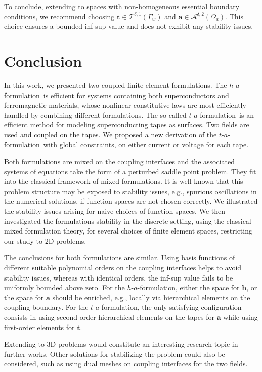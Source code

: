 \documentclass[journal]{IEEEtran}
\renewcommand{\vec}[1]{\boldsymbol{#1}} %
\renewcommand{\a}{\vec a}
\renewcommand{\t}{\vec t}
\newcommand{\h}{\vec h}
\newcommand{\Oa}{\Omega_a}
\newcommand{\haf}{$h$-$a$-formulation\ }
\newcommand{\taf}{$t$-$a$-formulation\ }
\newcommand{\hafOnly}{$h$-$a$-formulation}
\newcommand{\tafOnly}{$t$-$a$-formulation}
\newcommand{\aspdone}{\mathcal{A}^{\delta,1}}
\newcommand{\tspdone}{\mathcal{T}^{\delta,1}}
\newcommand{\aspdtwo}{\mathcal{A}^{\delta,2}}
\newcommand{\tspdtwo}{\mathcal{T}^{\delta,2}}
\begin{document}
To conclude, extending to spaces with non-homogeneous essential boundary conditions, we recommend choosing $\t \in \tspdone(\Gamma_w)$ and $\a \in \aspdtwo(\Oa)$. This choice ensures a bounded inf-sup value and does not exhibit any stability issues.


\section{Conclusion}\label{sec_conclusion}

In this work, we presented two coupled finite element formulations. The \haf is efficient for systems containing both superconductors and ferromagnetic materials, whose nonlinear constitutive laws are most efficiently handled by combining different formulations. The so-called \taf is an efficient method for modeling superconducting tapes as surfaces. Two fields are used and coupled on the tapes. We proposed a new derivation of the \taf with global constraints, on either current or voltage for each tape.

Both formulations are mixed on the coupling interfaces and the associated systems of equations take the form of a perturbed saddle point problem. They fit into the classical framework of mixed formulations. It is well known that this problem structure may be exposed to stability issues, e.g., spurious oscillations in the numerical solutions, if function spaces are not chosen correctly. We illustrated the stability issues arising for naive choices of function spaces. We then investigated the formulations stability in the discrete setting, using the classical mixed formulation theory, for several choices of finite element spaces, restricting our study to 2D problems.

The conclusions for both formulations are similar. Using basis functions of different suitable polynomial orders on the coupling interfaces helps to avoid stability issues, whereas with identical orders, the inf-sup value fails to be uniformly bounded above zero. For the \hafOnly, either the space for $\h$, or the space for $\a$ should be enriched, e.g., locally via hierarchical elements on the coupling boundary. For the \tafOnly, the only satisfying configuration consists in using second-order hierarchical elements on the tapes for $\a$ while using first-order elements for $\t$.

Extending to 3D problems would constitute an interesting research topic in further works. Other solutions for stabilizing the problem could also be considered, such as using dual meshes on coupling interfaces for the two fields.
\end{document}
